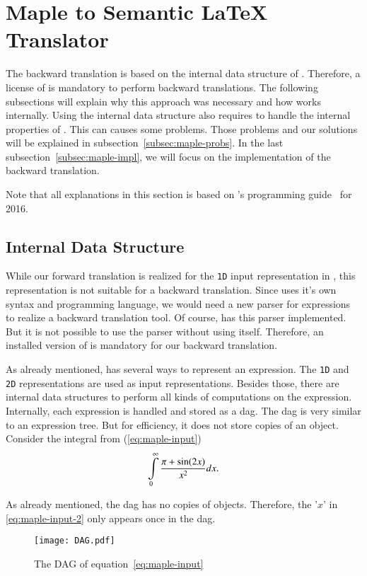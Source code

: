 \section{Maple to Semantic \LaTeX{} Translator}\label{sec:backward-translation}
The backward translation is based on the internal data structure of \Maple. Therefore, a license of \Maple{} is mandatory to perform backward translations. The following subsections will explain why this approach was necessary and how \Maple{} works internally. Using the internal data structure also requires to handle the internal properties of \Maple. This can causes some problems. Those problems and our solutions will be explained in subsection~\ref{subsec:maple-probs}. In the last subsection~\ref{subsec:maple-impl}, we will focus on the implementation of the backward translation.

Note that all explanations in this section is based on \Maple's programming guide~\cite{MAPLE:ProgrammingGuide} for \Maple{} 2016. 

\subsection{Internal Data Structure}
While our forward translation is realized for the \texttt{1D} input representation in \Maple, this representation is not suitable for a backward translation. Since \Maple{} uses it's own syntax and programming language, we would need a new parser for \Maple{} expressions to realize a backward translation tool. Of course, \Maple{} has this parser implemented. But it is not possible to use the parser without using \Maple{} itself. Therefore, an installed version of \Maple{} is mandatory for our backward translation.  

As already mentioned, \Maple{} has several ways to represent an expression. The \texttt{1D} and \texttt{2D} representations are used as input representations. Besides those, there are internal data structures to perform all kinds of computations on the expression. Internally, each expression is handled and stored as a \gls{dag}. The \Maple{} \gls{dag} is very similar to an expression tree. But for efficiency, it does not store copies of an object. Consider the integral from (\ref{eq:maple-input})
\begin{equation}\label{eq:maple-input-2}
\int\displaylimits_0^\infty \frac{\pi+\sin(2x)}{x^2} dx.
\end{equation}

As already mentioned, the \Maple{} \gls{dag} has no copies of objects. Therefore, the '$x$' in \eqref{eq:maple-input-2} only appears once in the \gls{dag}.
\begin{figure}[ht]
\centering
\texttt{[image: DAG.pdf]}
\caption{The \Maple{} DAG of equation~\eqref{eq:maple-input}}
\label{fig:maple-dag}
\end{figure}

